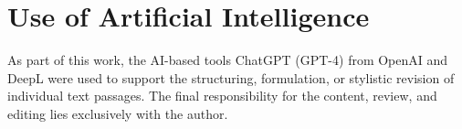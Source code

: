 {\section*{\centering Use of Artiﬁcial Intelligence}
As part of this work, the AI-based tools ChatGPT (GPT-4) from OpenAI and DeepL 
were used to support the structuring, formulation, or stylistic revision of individual text 
passages. The ﬁnal responsibility for the content, review, and editing lies exclusively 
with the author.}
\newpage
